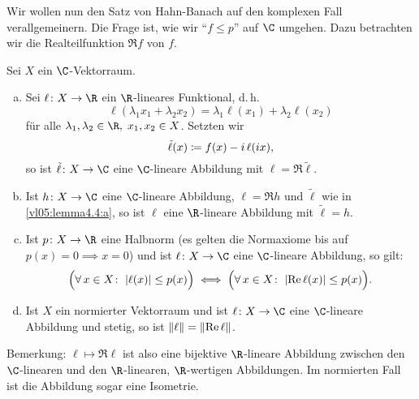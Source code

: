 Wir wollen nun den Satz von Hahn-Banach auf den komplexen Fall verallgemeinern.
Die Frage ist, wie wir \enquote{$f\leq p$\kern2pt} auf $\C$ umgehen. Dazu betrachten wir
die Realteilfunktion $\Re f$ von $f$.


\begin{thLemma} \label{vl05:lemma4.4}
    Sei $X$ ein $\C$-Vektorraum.
    \begin{enumerate}[(a)]
        \item \label{vl05:lemma4.4:a}
            Sei $\ell\colon X\to\R$ ein $\R$-lineares Funktional, d.\,h.
            \[ \ell(\lambda_1x_1+\lambda_2x_2) 
                = \lambda_1 \ell(x_1) + \lambda_2 \ell(x_2)
            \]
            für alle $\lambda_1,\lambda_2\in\R,\; x_1,x_2\in X$. Setzten wir
            \[ \tilde\ell(x) \coloneqq f(x) - i\,\ell(ix) , \]
            so ist $\tilde\ell\colon X\to\C$ eine $\C$-lineare Abbildung mit
            $\ell = \Re\tilde\ell$.
            
        \item \label{vl05:lemma4.4:b}
            Ist $h\colon X\to\C$ eine $\C$-lineare Abbildung, $\ell=\Re h$ und
            $\tilde\ell$ wie in \ref{vl05:lemma4.4:a},
            so ist $\ell$ eine $\R$-lineare Abbildung mit $\tilde\ell = h$.
            
        \item \label{vl05:lemma4.4:c}
            Ist $p\colon X\to\R$ eine Halbnorm (es gelten die Normaxiome bis auf
            $p(x)=0 \implies x=0$) und ist $\ell\colon X\to\C$ eine $\C$-lineare
            Abbildung, so gilt:
            \[ \Bigl( \forall\,x\in X\colon\; \lvert\ell(x)\rvert \leq p(x)  \Bigr)
                \iff
                \Bigl( \forall\,x\in X\colon\; \lvert\operatorname{Re}\ell(x)\rvert \leq p(x) \Bigr)
            . \]
            
        \item \label{vl05:lemma4.4:d}
            Ist $X$ ein normierter Vektorraum und ist $\ell\colon X\to\C$ eine
            $\C$-lineare Abbildung und stetig, so ist $\lVert\ell\rVert =
            \lVert\operatorname{Re}\ell\rVert$.
    \end{enumerate}
\end{thLemma}

Bemerkung: $\ell\mapsto\Re\ell$ ist also eine bijektive $\R$-lineare Abbildung
zwischen den $\C$-linearen und den $\R$-linearen, $\R$-wertigen Abbildungen.
Im normierten Fall ist die Abbildung sogar eine Isometrie.

